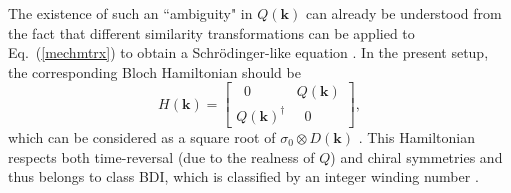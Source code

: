 \documentclass{tADP2e}
\theoremstyle{plain}
\theoremstyle{plain}
\theoremstyle{definition}
\begin{document}
The existence of such an ``ambiguity" in $Q(\boldsymbol{k})$ can already be understood from the fact that different similarity transformations can be applied to Eq.~(\ref{mechmtrx}) to obtain a Schr\"odinger-like equation \cite{SR16}. 
In the present setup, the corresponding Bloch Hamiltonian should be 
\begin{equation}
H(\boldsymbol{k})=\begin{bmatrix} \;\;0\;\; & Q(\boldsymbol{k}) \\ Q(\boldsymbol{k})^\dag & \;\;0\;\; \end{bmatrix},
\end{equation}
which can be considered as a square root of $\sigma_0\otimes D(\boldsymbol{k})$ \cite{KCL14}. This Hamiltonian respects both time-reversal (due to the realness of $Q$) and chiral symmetries and thus belongs to class BDI, which is classified by an integer winding number \cite{SAP08}. 
\end{document}

